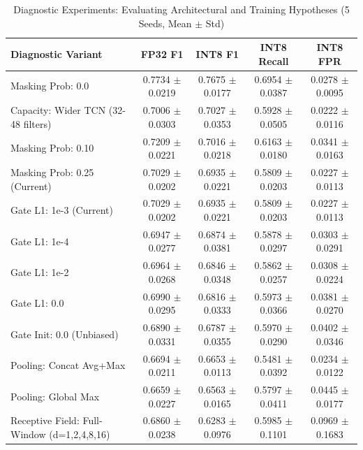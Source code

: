 \begin{table}[t]
\centering
\caption{Diagnostic Experiments: Evaluating Architectural and Training Hypotheses (5 Seeds, Mean $\pm$ Std)}
\label{tab:diagnostics}
\small
\begin{tabular}{lcccc}
\toprule
\textbf{Diagnostic Variant} & \textbf{FP32 F1} & \textbf{INT8 F1} & \textbf{INT8 Recall} & \textbf{INT8 FPR} \\
\midrule
Masking Prob: 0.0 & 0.7734 $\pm$ 0.0219 & 0.7675 $\pm$ 0.0177 & 0.6954 $\pm$ 0.0387 & 0.0278 $\pm$ 0.0095 \\
Capacity: Wider TCN (32-48 filters) & 0.7006 $\pm$ 0.0303 & 0.7027 $\pm$ 0.0353 & 0.5928 $\pm$ 0.0505 & 0.0222 $\pm$ 0.0116 \\
Masking Prob: 0.10 & 0.7209 $\pm$ 0.0221 & 0.7016 $\pm$ 0.0218 & 0.6163 $\pm$ 0.0180 & 0.0341 $\pm$ 0.0163 \\
Masking Prob: 0.25 (Current) & 0.7029 $\pm$ 0.0202 & 0.6935 $\pm$ 0.0221 & 0.5809 $\pm$ 0.0203 & 0.0227 $\pm$ 0.0113 \\
Gate L1: 1e-3 (Current) & 0.7029 $\pm$ 0.0202 & 0.6935 $\pm$ 0.0221 & 0.5809 $\pm$ 0.0203 & 0.0227 $\pm$ 0.0113 \\
Gate L1: 1e-4 & 0.6947 $\pm$ 0.0277 & 0.6874 $\pm$ 0.0381 & 0.5878 $\pm$ 0.0297 & 0.0303 $\pm$ 0.0291 \\
Gate L1: 1e-2 & 0.6964 $\pm$ 0.0268 & 0.6846 $\pm$ 0.0348 & 0.5862 $\pm$ 0.0257 & 0.0308 $\pm$ 0.0224 \\
Gate L1: 0.0 & 0.6990 $\pm$ 0.0295 & 0.6816 $\pm$ 0.0333 & 0.5973 $\pm$ 0.0366 & 0.0381 $\pm$ 0.0270 \\
Gate Init: 0.0 (Unbiased) & 0.6890 $\pm$ 0.0331 & 0.6787 $\pm$ 0.0355 & 0.5970 $\pm$ 0.0290 & 0.0402 $\pm$ 0.0346 \\
Pooling: Concat Avg+Max & 0.6694 $\pm$ 0.0211 & 0.6653 $\pm$ 0.0113 & 0.5481 $\pm$ 0.0392 & 0.0234 $\pm$ 0.0122 \\
Pooling: Global Max & 0.6659 $\pm$ 0.0227 & 0.6563 $\pm$ 0.0165 & 0.5797 $\pm$ 0.0411 & 0.0445 $\pm$ 0.0177 \\
Receptive Field: Full-Window (d=1,2,4,8,16) & 0.6860 $\pm$ 0.0238 & 0.6283 $\pm$ 0.0976 & 0.5985 $\pm$ 0.1101 & 0.0969 $\pm$ 0.1683 \\
\bottomrule
\end{tabular}
\end{table}